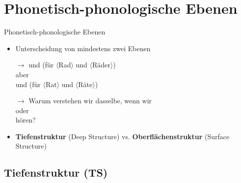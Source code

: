 %
\section{Phonetisch-phonologische Ebenen}
%

\begin{frame}{Phonetisch-phonologische Ebenen}

	\begin{itemize}
		\item Unterscheidung von mindestens zwei Ebenen
		\item[$\rightarrow$] \textipa{[\;R a: t]} und \textipa{[\;R E: d 5]} (für $\langle$Rad$\rangle$ und $\langle$Räder$\rangle$)\\
		aber\\
		\textipa{[\;R a: t]} und \textipa{[\;R E: t @]} (für $\langle$Rat$\rangle$ und $\langle$Räte$\rangle$)
		\item[]
		\item[$\rightarrow$] Warum verstehen wir dasselbe, wenn wir\\
		\textipa{[h a: k @ n]} oder \textipa{[h a: k N]}\\
		hören?
		\item[]
		\item \textbf{Tiefenstruktur} (Deep Structure) vs. \textbf{Oberflächenstruktur} (Surface Structure)
	\end{itemize}
	
\end{frame}



%
\subsection{Tiefenstruktur (TS)}
%

